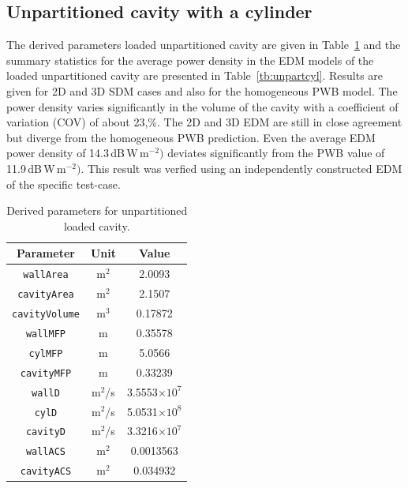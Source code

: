 \documentclass[a4paper]{article}
\numberwithin{equation}{section}
\newcounter{Table}
\begin{document}
\subsection[Unpartitioned cavity with a cylinder]{Unpartitioned cavity with a cylinder}
\label{sc:res:unpartcyl}

The derived parameters loaded unpartitioned cavity are given in Table~\ref{tb:derivparamsl} and the 
summary statistics for the average power density in the EDM models of the loaded unpartitioned cavity
are presented in Table~\ref{tb:unpartcyl}. Results are given for 2D and 3D SDM cases and also for the 
homogeneous PWB model. The power density varies significantly in the volume of the cavity with a coefficient 
of variation (COV) of about 23,\%. The 2D and 3D EDM are still in close agreement but diverge from the homogeneous
PWB prediction. Even the average EDM power density of 14.3\,dB\,W\,m$^{-2})$ deviates significantly from the PWB value
of 11.9\,dB\,W\,m$^{-2})$. This result was verfied using an independently constructed EDM of the specific test-case. 

\begin{table}[ht]
\begin{center}
\begin{tabular}{|c|c|c|}
\hline
\textbf{Parameter}     &\textbf{Unit} &\textbf{Value}\\ 
\hline
\texttt{wallArea}      &m$^2$         &2.0093              \\
\texttt{cavityArea}    &m$^2$         &2.1507              \\
\texttt{cavityVolume}  &m$^3$         &0.17872             \\
\texttt{wallMFP}       &m             &0.35578             \\
\texttt{cylMFP}        &m             &5.0566              \\
\texttt{cavityMFP}     &m             &0.33239             \\
\texttt{wallD}         &m$^2$/s       &3.5553$\times 10^7$ \\
\texttt{cylD}          &m$^2$/s       &5.0531$\times 10^8$ \\
\texttt{cavityD}       &m$^2$/s       &3.3216$\times 10^7$ \\
\texttt{wallACS}       &m$^2$         &0.0013563           \\
\texttt{cavityACS}     &m$^2$         &0.034932            \\
\hline
\end{tabular}
\end{center}
\caption{\label{tb:derivparamsl} Derived parameters for unpartitioned loaded cavity.}
\end{table}
\end{document}
